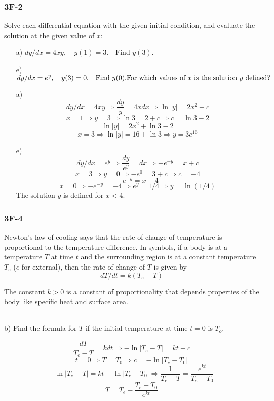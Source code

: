 \documentclass{article}
\begin{document}
\subsubsection{3F-2}
\begin{tcolorbox}
    Solve each differential equation with the given initial condition, and evaluate the solution at the given value of $x$: 
    \begin{itemize}
        \item[a)] $dy/dx = 4xy, \quad y(1) = 3. \quad \text{Find } y(3).$
        \item[e)] $dy/dx = e^y, \quad y(3) = 0. \quad \text{Find } y(0). \\
        \text{For which values of $x$ is the solution $y$ defined?}$
    \end{itemize}
\end{tcolorbox}
\begin{itemize}
    \item[a)]
    \[ dy/dx = 4xy \Rightarrow \frac{dy}{y} = 4xdx \Rightarrow \ln{|y|} = 2x^2 + c \]
    \[ x = 1 \Rightarrow y = 3 \Rightarrow \ln{3} = 2 + c \Rightarrow c = \ln{3} - 2 \]
    \[ \ln{|y|} = 2x^2 + \ln{3} - 2 \]
    \[ x = 3 \Rightarrow \ln{|y|} = 16 + \ln{3} \Rightarrow y = 3e^{16} \]

    \item[e)] 
    \[ dy/dx = e^y \Rightarrow \frac{dy}{e^y} = dx \Rightarrow -e^{-y} = x + c \]
    \[ x = 3 \Rightarrow y = 0 \Rightarrow -e^{0} = 3 + c \Rightarrow c = -4 \]
    \[ -e^{-y} = x - 4 \]
    \[ x = 0 \Rightarrow -e^{-y} = -4 \Rightarrow e^y = 1/4 \Rightarrow y = \ln{(1/4)} \]
    The solution $y$ is defined for $x < 4$.
\end{itemize}

\subsubsection{3F-4}
\begin{tcolorbox}
    Newton's law of cooling says that the rate of change of temperature is proportional to the temperature difference. In symbols, if a body is at a temperature $T$ at time $t$ and the surrounding region is at a constant temperature $T_e$ ($e$ for external), then the rate of change of $T$ is given by
    \[ dT/dt = k(T_e - T) \]
    \par The constant $k > 0$ is a constant of proportionality that depends properties of the body like specific heat and surface area. \\ \\
    \par b) Find the formula for $T$ if the initial temperature at time $t = 0$ is $T_o$. 
\end{tcolorbox}
\[ \frac{dT}{T_e - T} = kdt \Rightarrow -\ln{|T_e-T|} = kt + c \]
\[ t = 0 \Rightarrow T = T_0 \Rightarrow c = -\ln{|T_e - T_0|} \]
\[ -\ln{|T_e-T|} = kt -\ln{|T_e - T_0|} \Rightarrow \frac{1}{T_e - T} = \frac{e^{kt}}{T_e - T_0} \]
\[ T = T_e - \frac{T_e - T_0}{e^{kt}} \]
\end{document}

